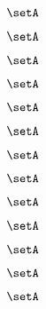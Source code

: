 \begin{forslides}
    \begin{equation}
        \label{eq:slides-processes-67}
        \setA
    \end{equation}

    \begin{equation}
        \label{eq:slides-processes-68}
        \setA
    \end{equation}

    \begin{equation}
        \label{eq:slides-processes-69}
        \setA
    \end{equation}

    \begin{equation}
        \label{eq:slides-processes-70}
        \setA
    \end{equation}

    \begin{equation}
        \label{eq:slides-processes-71}
        \setA
    \end{equation}

    \begin{equation}
        \label{eq:slides-processes-72}
        \setA
    \end{equation}

    \begin{equation}
        \label{eq:slides-processes-73}
        \setA
    \end{equation}

    \begin{equation}
        \label{eq:slides-processes-74}
        \setA
    \end{equation}

    \begin{equation}
        \label{eq:slides-processes-75}
        \setA
    \end{equation}

    \begin{equation}
        \label{eq:slides-processes-76}
        \setA
    \end{equation}

    \begin{equation}
        \label{eq:slides-processes-77}
        \setA
    \end{equation}

    \begin{equation}
        \label{eq:slides-processes-78}
        \setA
    \end{equation}

    \begin{equation}
        \label{eq:slides-processes-79}
        \setA
    \end{equation}


\end{forslides}
